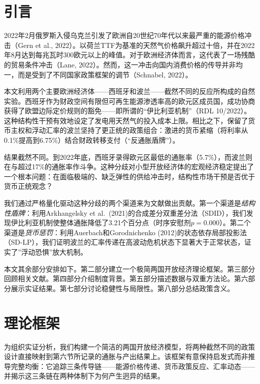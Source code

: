 \documentclass[12pt, a4paper]{article}
\begin{document}
\section{引言}

2022年2月俄罗斯入侵乌克兰引发了欧洲自20世纪70年代以来最严重的能源价格冲击（Gern et al., 2022）。以荷兰TTF为基准的天然气价格飙升超过十倍，并在2022年8月达到每兆瓦时300欧元以上的峰值。对于欧洲经济体而言，这代表了一场残酷的贸易条件冲击（Lane, 2022）。然而，这一冲击向国内消费价格的传导并非均一，而是受到了不同国家政策框架的调节（Schnabel, 2022）。

本文利用两个主要欧洲经济体——西班牙和波兰——截然不同的反应所构成的自然实验。西班牙作为财政空间有限但可再生能源渗透率高的欧元区成员国，成功协商获得了欧盟边际定价规则的豁免——即所谓的“伊比利亚机制”（RDL 10/2022）。这种结构性干预有效地设定了发电用天然气的投入成本上限。相比之下，保留了货币主权和浮动汇率的波兰坚持了更正统的政策组合：激进的货币紧缩（将利率从0.1\%提高到6.75\%）结合财政转移支付（“反通胀盾牌”）。

结果截然不同。到2022年底，西班牙录得欧元区最低的通胀率（5.7\%），而波兰则在与超过17\%的通胀率作斗争。这种分歧对小型开放经济体的宏观经济稳定提出了一个根本问题：在面临极端的、缺乏弹性的供给冲击时，结构性市场干预是否优于货币正统观念？

我们通过严格量化驱动这种分歧的两个渠道来为文献做出贡献。第一个渠道是\textit{结构性盾牌}：利用Arkhangelsky et al.\ (2021)的合成差分双重差分法（SDID），我们发现伊比利亚机制使整体通胀降低了3.21个百分点（时序安慰剂$p=0.000$）。第二个渠道是\textit{货币惩罚}：利用Auerbach和Gorodnichenko (2012)的状态依存局部投影法（SD-LP），我们证明波兰的汇率传递在高波动危机状态下显著大于正常状态，证实了”浮动恐惧”放大机制。

本文其余部分安排如下。第二部分建立一个极简两国开放经济理论框架。第三部分回顾相关文献。第四部分介绍制度背景。第五部分描述数据与双重方法论。第六部分展示实证结果。第七部分讨论稳健性与局限性。第八部分总结政策含义。



\section{理论框架}

为组织实证分析，我们构建一个简洁的两国开放经济模型，将两种截然不同的政策设计直接映射到第六节所记录的通胀与产出结果上。该框架有意保持启发式而非推导完整均衡：它追踪三条传导链——能源价格传递、货币政策反应、汇率动态——并揭示这三条链在两种体制下为何产生迥异的结果。
\end{document}
